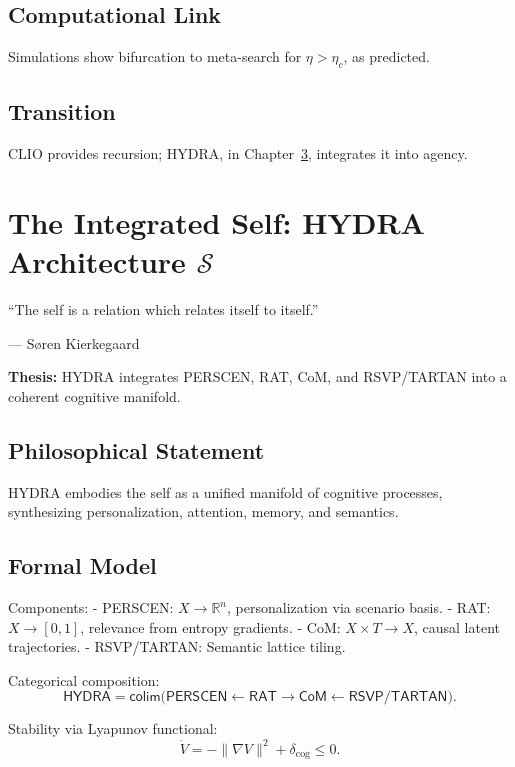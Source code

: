 \documentclass[12pt]{book}
\theoremstyle{definition}
\begin{document}
\section{Computational Link}
Simulations show bifurcation to meta-search for \(\eta > \eta_c\), as predicted.

\section{Transition}
CLIO provides recursion; HYDRA, in Chapter~\ref{chap:hydra}, integrates it into agency.

\chapter{The Integrated Self: HYDRA Architecture \texorpdfstring{\(\mathcal{S}\)}{S}}
\label{chap:hydra}
\epigraph{``The self is a relation which relates itself to itself.''}{--- Søren Kierkegaard}

\textbf{Thesis:} HYDRA integrates PERSCEN, RAT, CoM, and RSVP/TARTAN into a coherent cognitive manifold.

\section{Philosophical Statement}
HYDRA embodies the self as a unified manifold of cognitive processes, synthesizing personalization, attention, memory, and semantics.

\section{Formal Model}
Components:
- \textsf{PERSCEN}: \(X \to \mathbb{R}^n\), personalization via scenario basis.
- \textsf{RAT}: \(X \to [0,1]\), relevance from entropy gradients.
- \textsf{CoM}: \(X \times T \to X\), causal latent trajectories.
- \textsf{RSVP/TARTAN}: Semantic lattice tiling.

Categorical composition:
\begin{equation}
\textsf{HYDRA} = \textsf{colim}\Big( \textsf{PERSCEN} \xleftarrow{} \textsf{RAT} \xrightarrow{} \textsf{CoM} \xleftarrow{} \textsf{RSVP/TARTAN} \Big).
\end{equation}

Stability via Lyapunov functional:
\begin{equation}
\dot{V} = -\|\nabla V\|^2 + \delta_{\text{cog}} \leq 0.
\end{equation}
\end{document}
